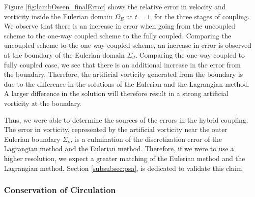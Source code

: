 Figure \ref{fig:lambOseen_finalError} shows the relative error in velocity and vorticity inside the Eulerian domain $\Omega_E$ at $t=1$, for the three stages of coupling. We observe that there is an increase in error when going from the uncoupled scheme to the one-way coupled scheme to the fully coupled. Comparing the uncoupled scheme to the one-way coupled scheme, an increase in error is observed at the boundary of the Eulerian domain $\Sigma_d$.  Comparing the one-way coupled to fully coupled case, we see that there is an additional increase in the error from the boundary. Therefore, the artificial vorticity generated from the boundary is due to the difference in the solutions of the Eulerian and the Lagrangian method. A larger difference in the solution will therefore result in a strong artificial vorticity at the boundary.

Thus, we were able to determine the sources of the errors in the hybrid coupling. The error in vorticity, represented by the artificial vorticity near the outer Eulerian boundary $\Sigma_o$, is a culmination of the discretization error of the Lagrangian method and the Eulerian method. Therefore, if we were to use a higher resolution, we expect a greater matching of the Eulerian method and the Lagrangian method. Section \ref{subsubsec:psa}, is dedicated to validate this claim.



\subsubsection{Conservation of Circulation}
\label{subsubsec:coc}


